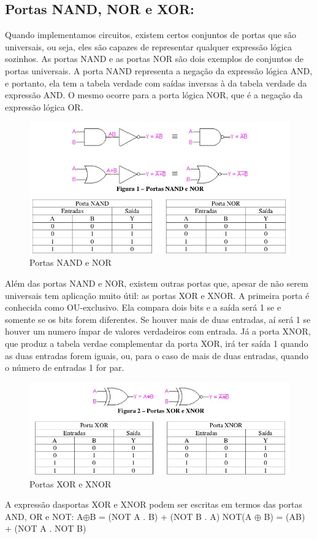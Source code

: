 \documentclass[12pt]{article}
\begin{document}
\subsection{Portas NAND, NOR e XOR:}

Quando implementamos circuitos, existem certos conjuntos de portas que são universais, ou seja, eles são capazes de representar qualquer expressão lógica sozinhos. As portas NAND e as portas NOR são dois exemplos de conjuntos de portas universais. A porta NAND representa a negação da expressão lógica AND, e portanto, ela tem a tabela verdade com saídas inversas à da tabela verdade da expressão AND. O mesmo ocorre para a porta lógica NOR, que é a negação da expressão lógica OR.

\begin{figure}[H]
	\centering
	\includegraphics[width=.5\textwidth]{nandnor.jpg}
	\caption{Portas NAND e NOR}
	\label{fig:exemplo}
\end{figure}

Além das portas NAND e NOR, existem outras portas que, apesar de não serem universais tem aplicação muito útil: as portas XOR e XNOR. A primeira porta é conhecida como OU-exclusivo. Ela compara dois bits e a saída será 1 se e somente se os bits forem diferentes. Se houver mais de duas entradas, aí será 1 se houver um numero ímpar de valores verdadeiros com entrada. Já a porta XNOR, que produz a tabela verdae complementar da porta XOR, irá ter saída 1 quando as duas entradas forem iguais, ou, para o caso de mais de duas entradas, quando o número de entradas 1 for par. 

\begin{figure}[H]
	\centering
	\includegraphics[width=.5\textwidth]{xorxnor.jpg}
	\caption{Portas XOR e XNOR}
	\label{fig:exemplo}
\end{figure}

A expressão dasportas XOR e XNOR podem ser escritas em termos das portas AND, OR e NOT:
A$\oplus$B = (NOT A . B) + (NOT B . A)
NOT(A $\oplus$ B) = (AB) + (NOT A . NOT B)
\end{document}

